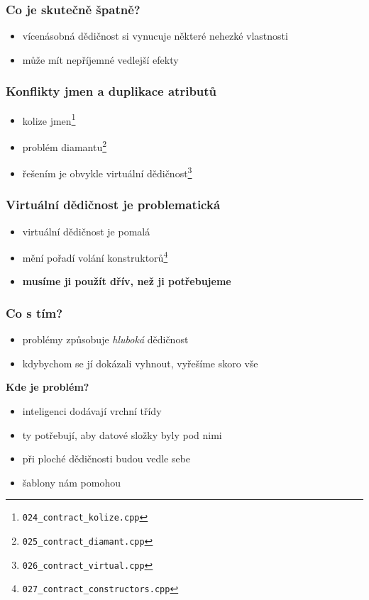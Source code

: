 	\begin{frame}
		\frametitle{Co je \textbf{skutečně} špatně?}
		\begin{itemize}
			\item{vícenásobná dědičnost si vynucuje některé nehezké vlastnosti}
			\item{může mít nepříjemné vedlejší efekty}
		\end{itemize}
	\end{frame}

	\begin{frame}
		\frametitle{Konflikty jmen a duplikace atributů}
		\begin{itemize}
			\item{kolize jmen\footnote{\texttt{024\_contract\_kolize.cpp}}}
			\item{problém diamantu\footnote{\texttt{025\_contract\_diamant.cpp}}}
			\item{řešením je obvykle virtuální dědičnost\footnote{\texttt{026\_contract\_virtual.cpp}}}
		\end{itemize}
	\end{frame}

	\begin{frame}
		\frametitle{Virtuální dědičnost je problematická}
		\begin{itemize}
			\item{virtuální dědičnost je pomalá}
			\item{mění pořadí volání konstruktorů\footnote{\texttt{027\_contract\_constructors.cpp}}}
			\item{\textbf{musíme ji použít dřív, než ji potřebujeme}}
		\end{itemize}
	\end{frame}

	\begin{frame}
		\frametitle{Co s tím?}
		\begin{itemize}
			\item{problémy způsobuje \textit{hluboká} dědičnost}
			\item{kdybychom se jí dokázali vyhnout, vyřešíme skoro vše}
		\end{itemize}\pause
		\textbf{Kde je problém?}
		\begin{itemize}
			\item{inteligenci dodávají vrchní třídy}
			\item{ty potřebují, aby datové složky byly pod nimi}
			\item{při ploché dědičnosti budou vedle sebe}
			\item{šablony nám pomohou}
		\end{itemize}
	\end{frame}

